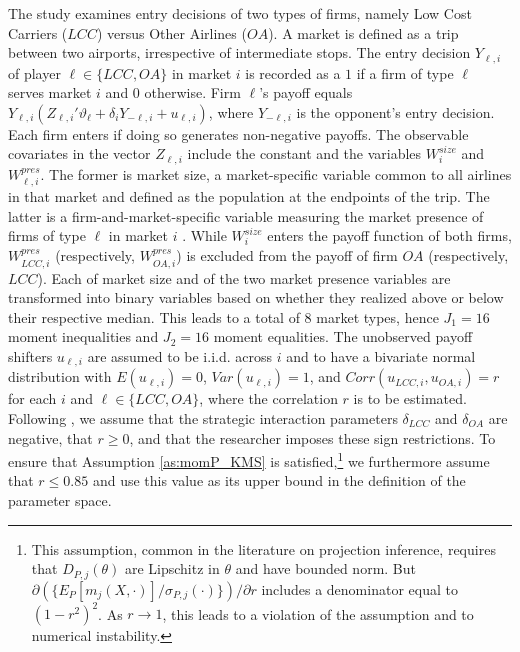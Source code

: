 \documentclass[letterpaper,11pt]{article}
\theoremstyle{myplain}
\theoremstyle{mydefinition}
\theoremstyle{myremark}
\renewcommand{\cite}{\citet}
\numberwithin{equation}{section}
\numberwithin{figure}{section}
\begin{document}
The study examines entry decisions of two types of firms, namely Low Cost Carriers ($LCC$) versus Other Airlines ($OA$).  A market is defined as a trip between two airports, irrespective of intermediate stops.  The entry decision $Y_{\ell,i}$ of player $\ell\in\{LCC,OA\}$ in market $i$ is recorded as a $1$ if a firm of type $\ell$ serves market $i$ and $0$ otherwise.  Firm $\ell$'s payoff equals $Y_{\ell,i}(Z_{\ell,i}'\vartheta_\ell+\delta_i Y_{-\ell,i}+u_{\ell,i})$, where $Y_{-\ell,i}$ is the opponent's entry decision. Each firm enters if doing so generates non-negative payoffs.
The observable covariates in the vector $Z_{\ell,i}$ include the constant and the variables $W_i^{size}$ and $W_{\ell,i}^{pres}$. The former is market size, a market-specific variable common to all airlines in that market and defined as the population at the endpoints of the trip. The latter is a firm-and-market-specific variable measuring the market presence of firms of type $\ell$ in market $i$ \citep[see][p. 356 for its exact definition]{KT15}. While $W_i^{size}$ enters the payoff function of both firms, $W_{LCC,i}^{pres}$ (respectively, $W_{OA,i}^{pres}$) is excluded from the payoff of firm $OA$ (respectively, $LCC$). 
Each of market size and of the two market presence variables are transformed into binary variables based on whether they realized above or below their respective median.
This leads to a total of 8 market types, hence $J_1=16$ moment inequalities and $J_2=16$ moment equalities.
The unobserved payoff shifters $u_{\ell,i}$ are assumed to be i.i.d. across $i$ and to have a bivariate normal distribution with $E(u_{\ell,i})=0$, $Var(u_{\ell,i})=1$, and $Corr(u_{LCC,i},u_{OA,i})=r$ for each $i$ and $\ell\in\{LCC,OA\}$, where the correlation $r$ is to be estimated. Following \cite{KT15}, we assume that the strategic interaction parameters $\delta_{LCC}$ and $\delta_{OA}$ are negative, that $r\ge 0$, and that the researcher imposes these sign restrictions. To ensure that Assumption \ref{as:momP_KMS} is satisfied,\footnote{This assumption, common in the literature on projection inference, requires that $D_{P,j}(\theta)$ are Lipschitz in $\theta$ and have bounded norm. But $\partial(\{E_P[m_j(X,\cdot)]/\sigma_{P,j}(\cdot)\})/\partial r$ includes a denominator equal to $(1-r^2)^2$. As $r\to 1$, this leads to a violation of the assumption and to numerical instability.} we furthermore assume that $r\le 0.85$ and use this value as its upper bound in the definition of the parameter space.
\end{document}
